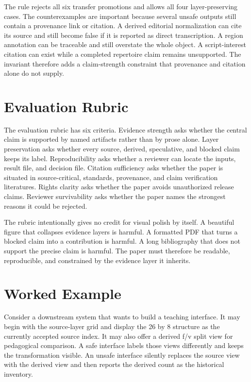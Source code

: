 \documentclass[sigconf,nonacm]{acmart}
\begin{document}
The rule rejects all six transfer promotions and allows all four
layer-preserving cases. The counterexamples are important because several unsafe
outputs still contain a provenance link or citation. A derived editorial
normalization can cite its source and still become false if it is reported as
direct transcription. A region annotation can be traceable and still overstate
the whole object. A script-interest citation can exist while a completed
repertoire claim remains unsupported. The invariant therefore adds a
claim-strength constraint that provenance and citation alone do not supply.

\section{Evaluation Rubric}
The evaluation rubric has six criteria. Evidence strength asks whether the
central claim is supported by named artifacts rather than by prose alone.
Layer preservation asks whether every source, derived, speculative, and blocked
claim keeps its label. Reproducibility asks whether a reviewer can locate the
inputs, result file, and decision file. Citation sufficiency asks whether the
paper is situated in source-critical, standards, provenance, and claim
verification literatures. Rights clarity asks whether the paper avoids
unauthorized release claims. Reviewer survivability asks whether the paper names
the strongest reasons it could be rejected.

The rubric intentionally gives no credit for visual polish by itself. A
beautiful figure that collapses evidence layers is harmful. A formatted PDF that
turns a blocked claim into a contribution is harmful. A long bibliography that
does not support the precise claim is harmful. The paper must therefore be
readable, reproducible, and constrained by the evidence layer it inherits.

\section{Worked Example}
Consider a downstream system that wants to build a teaching interface. It may
begin with the source-layer grid and display the 26 by 8 structure as the
currently accepted source index. It may also offer a derived f/v split view for
pedagogical comparison. A safe interface labels those views differently and
keeps the transformation visible. An unsafe interface silently replaces the
source view with the derived view and then reports the derived count as the
historical inventory.
\end{document}

